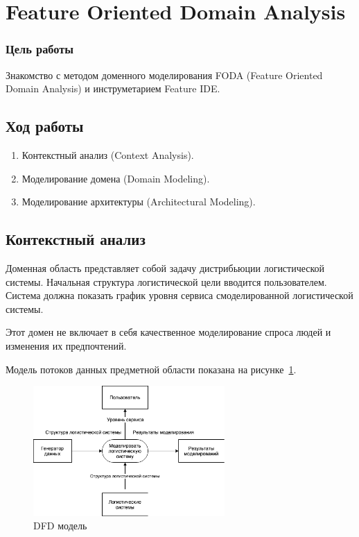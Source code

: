 


\newcommand{\labnumber}{2} %



\graphicspath{{figures/}}


\Ukrainian


\addtocounter{page}{1}

\section*{Feature Oriented Domain Analysis}
\subsubsection*{Цель работы}
Знакомство с методом доменного моделирования FODA (Feature Oriented Domain Analysis) и инструметарием Feature IDE.

\subsection*{Ход работы}
\begin{enumerate}
    \item Контекстный анализ (Context Analysis).
    \item Моделирование домена (Domain Modeling).
    \item Моделирование архитектуры (Architectural Modeling).
\end{enumerate}

\subsection{Контекстный анализ}
Доменная область представляет собой задачу дистрибьюции логистической системы. 
Начальная структура логистической цели вводится пользователем. 
Система должна показать график уровня сервиса смоделированной логистической системы.

Этот домен не включает в себя качественное моделирование спроса людей и изменения их предпочтений.

Модель потоков данных предметной области показана на рисунке~\ref{fig:dfd}.

\begin{figure}[H]
    \centering
    \includegraphics[width=0.65\textwidth]{dfd}
    \caption{DFD модель}
    \label{fig:dfd}
\end{figure}

